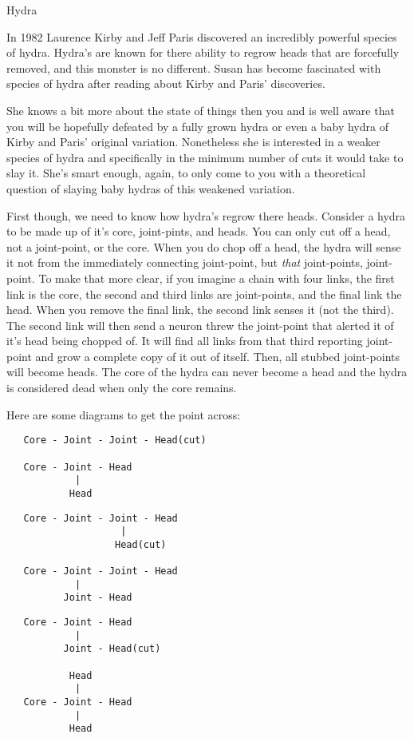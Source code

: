 \begin{problem}{Hydra}
\end{problem}
In 1982 Laurence Kirby and Jeff Paris discovered an incredibly powerful species of hydra.
Hydra's are known for there ability to regrow heads that are forcefully removed, and this monster is no different.
Susan has become fascinated with species of hydra after reading about Kirby and Paris' discoveries.

She knows a bit more about the state of things then you and is well aware that you will be hopefully defeated by a fully grown hydra or even a baby hydra of Kirby and Paris' original variation.
Nonetheless she is interested in a weaker species of hydra and specifically in the minimum number of cuts it would take to slay it.
She's smart enough, again, to only come to you with a theoretical question of slaying baby hydras of this weakened variation.

First though, we need to know how hydra's regrow there heads.
Consider a hydra to be made up of it's core, joint-pints, and heads.
You can only cut off a head, not a joint-point, or the core.
When you do chop off a head, the hydra will sense it not from the immediately connecting joint-point, but \textit{that} joint-points, joint-point.
To make that more clear, if you imagine a chain with four links, the first link is the core, the second and third links are joint-points, and the final link the head.
When you remove the final link, the second link senses it (not the third).
The second link will then send a neuron threw the joint-point that alerted it of it's head being chopped of.
It will find all links from that third reporting joint-point and grow a complete copy of it out of itself.
Then, all stubbed joint-points will become heads.
The core of the hydra can never become a head and the hydra is considered dead when only the core remains.

Here are some diagrams to get the point across:

\begin{verbatim}
   Core - Joint - Joint - Head(cut)

   Core - Joint - Head
            |
           Head
\end{verbatim}
\begin{verbatim}
   Core - Joint - Joint - Head
                    |
                   Head(cut)

   Core - Joint - Joint - Head
            |
          Joint - Head
\end{verbatim}
\begin{verbatim}
   Core - Joint - Head
            |
          Joint - Head(cut)

           Head
            |
   Core - Joint - Head
            |
           Head
\end{verbatim}

